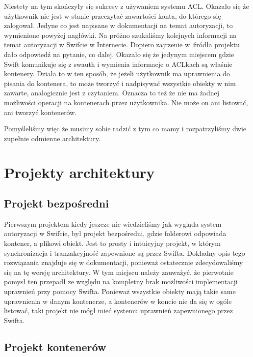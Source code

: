 	Niestety na tym skończyły się sukcesy z używaniem systemu ACL. Okazało się że użytkownik nie jest w stanie przeczytać zawartości konta, do którego się zalogował. Jedyne co jest napisane w dokumentacji na temat autoryzacji, to wymienione powyżej nagłówki. Na próżno szukaliśmy kolejnych informacji na temat autoryzacji w Swifcie w Internecie. Dopiero zajrzenie w~źródła projektu dało odpowiedź na pytanie, co dalej. Okazało się że jedynym miejscem gdzie Swift komunikuje się z swauth i wymienia informacje o ACLkach są właśnie kontenery. Działa to w ten sposób, że jeżeli użytkownik ma uprawnienia do pisania do kontenera, to może tworzyć i nadpisywać wszystkie obiekty w nim zawarte, analogicznie jest z czytaniem. Oznacza to też że nie ma żadnej możliwości operacji na kontenerach przez użytkownika. Nie może on ani listować, ani tworzyć kontenerów.

	Pomyśleliśmy więc że musimy sobie radzić z tym co mamy i rozpatrzyliśmy dwie zupełnie odmienne architektury.
	
	\section{Projekty architektury}\label{sec:projekty architektury}

	\subsection{Projekt bezpośredni}\label{sub:projekt bezposredni}

	Pierwszym projektem kiedy jeszcze nie wiedzieliśmy jak wygląda system autoryzacji w Swifcie, był projekt bezpośredni, gdzie folderowi odpowiada kontener, a plikowi obiekt. Jest to prosty i intuicyjny projekt, w którym synchronizacja i tranzakcyjność zapewnione są przez Swifta. Dokładny opis tego rozwiązania znajduje się w dokumentacji, ponieważ ostatecznie zdecydowaliśmy się na tę wersję architektury. W tym miejscu należy zauważyć, że pierwotnie pomysł ten przepadł ze względu na kompletny brak możliwości implementacji uprawnień przy pomocy Swifta. Ponieważ wszystkie obiekty mają takie same uprawnienia w danym kontenerze, a kontenerów w koncie nie da się w ogóle listować, taki projekt nie mógł mieć systemu uprawnień zapewnionego przez Swifta.
	
	\subsection{Projekt kontenerów}\label{sub:projekt kontenerow}

